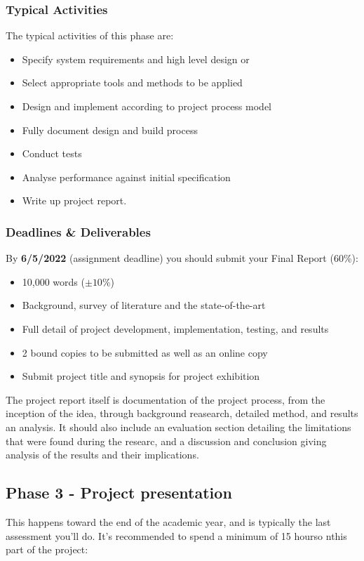 \subsubsection{Typical Activities}

The typical activities of this phase are: 

\begin{itemize}
    \item Specify system requirements and high level design or
    \item Select appropriate tools and methods to be applied
    \item Design and implement according to project process model
    \item Fully document design and build process
    \item Conduct tests
    \item Analyse performance against initial specification
    \item Write up project report.
\end{itemize}

\subsubsection{Deadlines \& Deliverables}

By \textbf{6/5/2022} (assignment deadline) you should submit your Final Report (60\%):

\begin{itemize}
    \item 10,000 words ($\pm 10\%$)
    \item Background, survey of literature and the state-of-the-art
    \item Full detail of project development, implementation, testing, and results
    \item 2 bound copies to be submitted as well as an online copy
    \item Submit project title and synopsis for project exhibition
\end{itemize}

The project report itself is documentation of the project process, from the inception of the idea, through background reasearch, detailed method, and results an analysis. It should also include an evaluation section detailing the limitations that were found during the researc, and a discussion and conclusion giving analysis of the results and their implications. 

\subsection{Phase 3 - Project presentation}
This happens toward the end of the academic year, and is typically the last assessment you'll do. It's recommended to spend a minimum of 15 hourso nthis part of the project:

